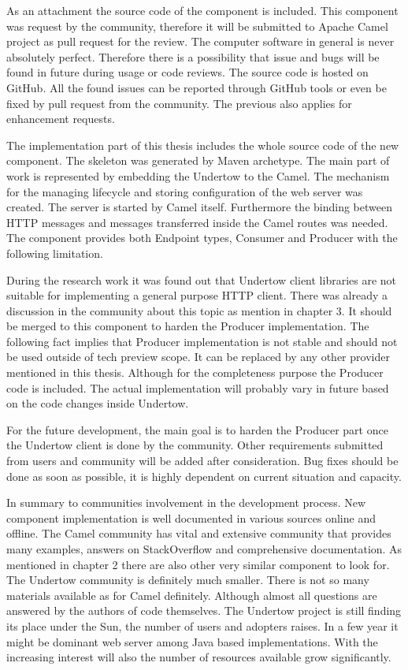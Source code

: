 \documentclass[12pt,final,oneside]{fithesis2}
\begin{document}
As an attachment the source code of the component is included. This component was request by the community, therefore it will be submitted to Apache Camel project as pull request for the review. The computer software in general is never absolutely perfect. Therefore there is a possibility that issue and bugs will be found in future during usage or code reviews. The source code is hosted on GitHub. All the found issues can be reported through GitHub tools or even be fixed by pull request from the community. The previous also applies for enhancement requests.

The implementation part of this thesis includes the whole source code of the new component. The skeleton was generated by Maven archetype. The main part of work is represented by embedding the Undertow to the Camel. The mechanism for the managing lifecycle and storing configuration of the web server was created. The server is started by Camel itself. Furthermore the binding between HTTP messages and messages transferred inside the Camel routes was needed. The component provides both Endpoint types, Consumer and Producer with the following limitation.

During the research work it was found out that Undertow client libraries are not suitable for implementing a general purpose HTTP client.
There was already a discussion in the community about this topic as mention in chapter 3. It should be merged to this component to harden the Producer implementation. The following fact implies that Producer implementation is not stable and should not be used outside of tech preview scope. It can be replaced by any other provider mentioned in this thesis. Although for the completeness purpose the Producer code is included. The actual implementation will probably vary in future based on the code changes inside Undertow.

For the future development, the main goal is to harden the Producer part once the Undertow client is done by the community. Other requirements submitted from users and community will be added after consideration. Bug fixes should be done as soon as possible, it is highly dependent on current situation and capacity.

In summary to communities involvement in the development process. New component implementation is well documented in various sources online and offline. The Camel community has vital and extensive community that provides many examples, answers on StackOverflow and comprehensive documentation. As mentioned in chapter 2 there are also other very similar component to look for. The Undertow community is definitely much smaller. There is not so many materials available as for Camel definitely. Although almost all questions are answered by the authors of code themselves. The Undertow project is still finding its place under the Sun, the number of users and adopters raises. In a few year it might be dominant web server among Java based implementations. With the increasing interest will also the number of resources available grow significantly. 
\end{document}
